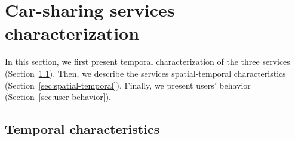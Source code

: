 \section{Car-sharing services characterization} 
\label{sec:3_4_characterization}

In this section, we first present temporal characterization of the three services (Section~\ref{sec:temporal_characterization}). Then, we describe the services spatial-temporal characteristics (Section~\ref{sec:spatial-temporal}). Finally, we present users' behavior (Section~\ref{sec:user-behavior}).

\subsection{Temporal characteristics}\label{sec:temporal_characterization}

